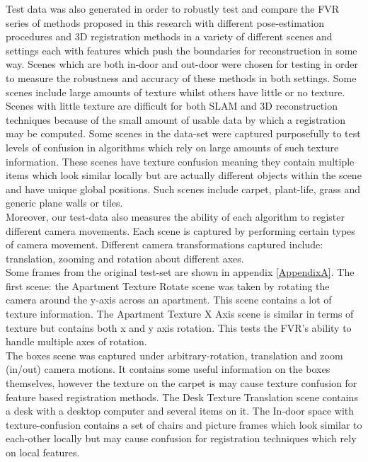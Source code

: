 Test data was also generated in order to robustly test and compare the FVR series of methods proposed in this research with different pose-estimation procedures and 3D registration methods in a variety of different scenes and settings each with features which push the boundaries for reconstruction in some way. Scenes which are both in-door and out-door were chosen for testing in order to measure the robustness and accuracy of these methods in both settings. Some scenes include large amounts of texture whilst others have little or no texture. Scenes with little texture are difficult for both SLAM and 3D reconstruction techniques because of the small amount of usable data by which a registration may be computed. Some scenes in the data-set were captured purposefully to test levels of confusion in algorithms which rely on large amounts of such texture information. These scenes have texture confusion meaning they contain multiple items which look similar locally but are actually different objects within the scene and have unique global positions. Such scenes include carpet, plant-life, grass and generic plane walls or tiles. \\

Moreover, our test-data also measures the ability of each algorithm to register different camera movements. Each scene is captured by performing certain types of camera movement. Different camera transformations captured include: translation, zooming and rotation about different axes. \\

Some frames from the original test-set are shown in appendix \ref{AppendixA}. The first scene: the Apartment Texture Rotate scene was taken by rotating the camera around the y-axis across an apartment. This scene contains a lot of texture information. The Apartment Texture X Axis scene is similar in terms of texture but contains both x and y axis rotation. This tests the FVR's ability to handle multiple axes of rotation. \\

The boxes scene was captured under arbitrary-rotation, translation and zoom (in/out) camera motions. It contains some useful information on the boxes themselves, however the texture on the carpet is may cause texture confusion for feature based registration methods. The Desk Texture Translation scene contains a desk with a desktop computer and several items on it. The In-door space with texture-confusion contains a set of chairs and picture frames which look similar to each-other locally but may cause confusion for registration techniques which rely on local features.  \\

